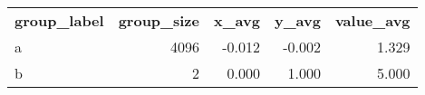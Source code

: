 \begin{tabular}{lrrrr}
\textbf{ group\_label } & \textbf{ group\_size } & \textbf{ x\_avg } & \textbf{ y\_avg } & \textbf{ value\_avg } \\
a & 4096 & -0.012 & -0.002 & 1.329 \\
b & 2 & 0.000 & 1.000 & 5.000 \\
\end{tabular}
